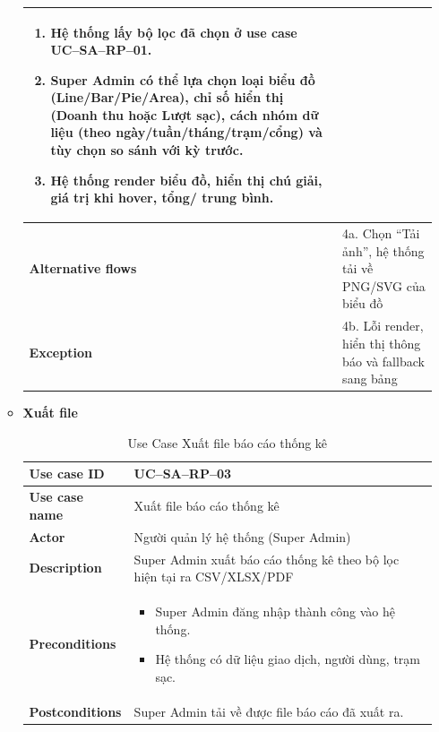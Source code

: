 \begin{enumerate}[label=\textbf{\alph*)}]
\begin{itemize}
\begin{center}
\begin{longtable}{|m{}|m{}|}
\begin{enumerate}[label=\arabic*.]
            \item Hệ thống lấy bộ lọc đã chọn ở use case UC--SA--RP--01.
            \item Super Admin có thể lựa chọn loại biểu đồ (Line/Bar/Pie/Area), chỉ số hiển thị (Doanh thu hoặc Lượt sạc), cách nhóm dữ liệu (theo ngày/tuần/tháng/trạm/cổng) và tùy chọn so sánh với kỳ trước.
            \item Hệ thống render biểu đồ, hiển thị chú giải, giá trị khi hover, tổng/ trung bình.
          \end{enumerate}\\
          \hline
          \textbf{Alternative flows} &
          4a. Chọn “Tải ảnh”, hệ thống tải về PNG/SVG của biểu đồ\\
          \hline
          \textbf{Exception} &
          4b. Lỗi render, hiển thị thông báo và fallback sang bảng\\
          \hline
          \end{longtable}
      \end{center}
    \item \textbf{Xuất file}
      \begin{center}
        \renewcommand{\arraystretch}{1.5}
        \begin{longtable}{|m{}|m{}|}
          \caption{Use Case Xuất file báo cáo thống kê}
          \label{tab:uc_sa_rp_03} \\
          \hline
          \textbf{Use case ID} & UC--SA--RP--03 \\
          \hline
          \textbf{Use case name} & Xuất file báo cáo thống kê \\
          \hline
          \textbf{Actor} & Người quản lý hệ thống (Super Admin) \\
          \hline
          \textbf{Description} & Super Admin xuất báo cáo thống kê theo bộ lọc hiện tại ra CSV/XLSX/PDF\\
          \hline
          \textbf{Preconditions} &
          \begin{itemize}
            \item Super Admin đăng nhập thành công vào hệ thống.
            \item Hệ thống có dữ liệu giao dịch, người dùng, trạm sạc.
          \end{itemize}\\
          \hline
          \textbf{Postconditions} &
          Super Admin tải về được file báo cáo đã xuất ra.\\
          \hline

\end{longtable}
\end{center}
\end{itemize}
\end{enumerate}
